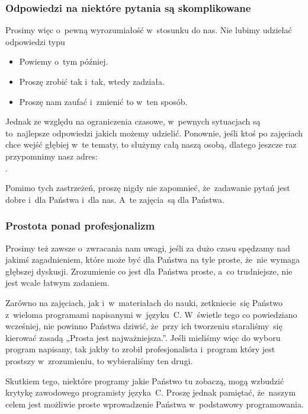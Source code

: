 \documentclass[10pt,t]{beamer}
\begin{document}
\begin{frame}
  \frametitle{Odpowiedzi na niektóre pytania są skomplikowane}


  Prosimy więc o~pewną wyrozumiałość w~stosunku do nas. Nie lubimy
  udzielać odpowiedzi typu
  \begin{itemize}

  \item Powiemy o~tym później.

  \item Proszę zrobić tak i~tak, wtedy zadziała.

  \item Proszę nam zaufać i~zmienić to w~ten sposób.

  \end{itemize}
  Jednak ze względu na ograniczenia czasowe, w~pewnych sytuacjach są
  to~najlepsze odpowiedzi jakich możemy udzielić. Ponownie, jeśli ktoś
  po zajęciach chce wejść głębiej w~te tematy, to służymy całą naszą osobą,
  dlatego jeszcze raz przypomnimy nasz adres: \\
  \email.

  Pomimo tych zastrzeżeń, proszę nigdy nie zapomnieć, że~zadawanie pytań
  jest dobre i~dla Państwa i~dla nas. A~te zajęcia~są dla Państwa.

\end{frame}





\begin{frame}
  \frametitle{Prostota ponad profesjonalizm}


  Prosimy też \alert{zawsze} o~zwracania nam uwagi, jeśli za dużo czasu
  spędzamy nad jakimś zagadnieniem, które może być dla Państwa na tyle
  proste, że~nie wymaga głębszej dyskusji. Zrozumienie co jest dla Państwa
  proste, a~co trudniejsze, nie jest wcale łatwym zadaniem.

  Zarówno na zajęciach, jak i~w~materiałach do nauki, zetkniecie~się
  Państwo z~wieloma programami napisanymi w~języku~C. W~świetle tego co
  powiedziano wcześniej, nie powinno Państwa dziwić, że~przy ich tworzeniu
  staraliśmy~się kierować zasadą „Prosta jest najważniejsza.”. Jeśli
  mieliśmy więc do wyboru program napisany, tak jakby to zrobił
  profesjonalista i~program który jest prostszy w~zrozumieniu, to
  wybieraliśmy ten drugi.

  Skutkiem tego, niektóre programy jakie Państwo tu zobaczą, mogą wzbudzić
  krytykę zawodowego programisty języka~C. Proszę jednak pamiętać,
  że~naszym celem jest możliwie proste wprowadzenie Państwa w~podstawowy
  programowania.

\end{frame}
\end{document}

